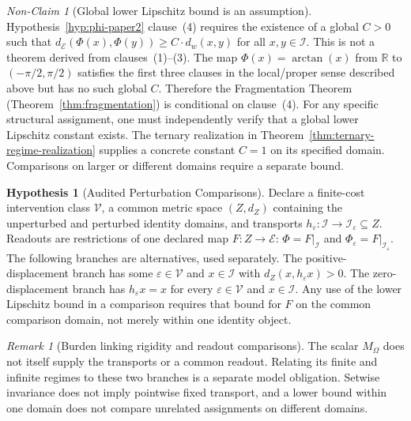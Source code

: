 \documentclass[11pt,a4paper]{article}
\theoremstyle{plain}
\theoremstyle{definition}
\newtheorem{hypothesis}[theorem]{Hypothesis}
\theoremstyle{remark}
\newtheorem{remark}[theorem]{Remark}
\newtheorem{nonclaim}[theorem]{Non-Claim}
\begin{document}
\begin{nonclaim}[Global lower Lipschitz bound is an assumption]\label{nonclaim:hphi-lower-bound}
Hypothesis~\ref{hyp:phi-paper2} clause~(4) requires the existence of a global $C>0$ such that $d_{\mathcal{E}}(\Phi(x),\Phi(y))\geq C\cdot d_w(x,y)$ for all $x,y\in\mathcal{I}$. This is not a theorem derived from clauses~(1)--(3). The map $\Phi(x)=\arctan(x)$ from $\mathbb{R}$ to $(-\pi/2,\pi/2)$ satisfies the first three clauses in the local/proper sense described above but has no such global $C$. Therefore the Fragmentation Theorem (Theorem~\ref{thm:fragmentation}) is conditional on clause~(4). For any specific structural assignment, one must independently verify that a global lower Lipschitz constant exists. The ternary realization in Theorem~\ref{thm:ternary-regime-realization} supplies a concrete constant $C=1$ on its specified domain. Comparisons on larger or different domains require a separate bound.
\end{nonclaim}

\begin{hypothesis}[Audited Perturbation Comparisons]\label{hyp:audited-comparison}
Declare a finite-cost intervention class $\mathcal V$, a common metric space $(Z,d_Z)$ containing the unperturbed and perturbed identity domains, and transports $h_\varepsilon:\mathcal I\to\mathcal I_\varepsilon\subseteq Z$. Readouts are restrictions of one declared map $F:Z\to\mathcal E$: $\Phi=F|_{\mathcal I}$ and $\Phi_\varepsilon=F|_{\mathcal I_\varepsilon}$.
The following branches are alternatives, used separately. The positive-displacement branch has some $\varepsilon\in\mathcal V$ and $x\in\mathcal I$ with $d_Z(x,h_\varepsilon x)>0$. The zero-displacement branch has $h_\varepsilon x=x$ for every $\varepsilon\in\mathcal V$ and $x\in\mathcal I$. Any use of the lower Lipschitz bound in a comparison requires that bound for $F$ on the common comparison domain, not merely within one identity object.
\end{hypothesis}

\begin{remark}[Burden linking rigidity and readout comparisons]
The scalar $M_\Omega$ does not itself supply the transports or a common readout. Relating its finite and infinite regimes to these two branches is a separate model obligation. Setwise invariance does not imply pointwise fixed transport, and a lower bound within one domain does not compare unrelated assignments on different domains.
\end{remark}
\end{document}
